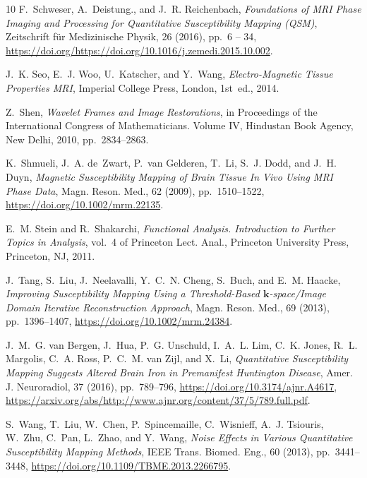 \documentclass[reqno]{siamonline1116}
\numberwithin{theorem}{section}
\numberwithin{equation}{section}
\begin{document}
\begin{thebibliography}{10}
{\sc F.~Schweser, A.~Deistung., and J.~R. Reichenbach}, {\em {Foundations of
  MRI Phase Imaging and Processing for Quantitative Susceptibility Mapping
  (QSM)}}, Zeitschrift f\"{u}r Medizinische Physik, 26 (2016), pp.~6 -- 34,
  \url{https://doi.org/https://doi.org/10.1016/j.zemedi.2015.10.002}.

{\sc J.~K. Seo, E.~J. Woo, U.~Katscher, and Y.~Wang}, {\em {Electro-Magnetic
  Tissue Properties MRI}}, Imperial College Press, London, 1st~ed., 2014.

{\sc Z.~Shen}, {\em {Wavelet Frames and Image Restorations}}, in Proceedings of
  the {I}nternational {C}ongress of {M}athematicians. {V}olume {IV}, Hindustan
  Book Agency, New Delhi, 2010, pp.~2834--2863.

{\sc K.~Shmueli, J.~A. de~Zwart, P.~van Gelderen, T.~Li, S.~J. Dodd, and J.~H.
  Duyn}, {\em {Magnetic Susceptibility Mapping of Brain Tissue In Vivo Using
  MRI Phase Data}}, Magn. Reson. Med., 62 (2009), pp.~1510--1522,
  \url{https://doi.org/10.1002/mrm.22135}.

{\sc E.~M. Stein and R.~Shakarchi}, {\em {Functional Analysis. Introduction to
  Further Topics in Analysis}}, vol.~4 of Princeton Lect. Anal., Princeton
  University Press, Princeton, NJ, 2011.

{\sc J.~Tang, S.~Liu, J.~Neelavalli, Y.~C.~N. Cheng, S.~Buch, and E.~M.
  Haacke}, {\em {Improving Susceptibility Mapping Using a Threshold-Based
  $\boldsymbol{k}$-space/Image Domain Iterative Reconstruction Approach}},
  Magn. Reson. Med., 69 (2013), pp.~1396--1407,
  \url{https://doi.org/10.1002/mrm.24384}.

{\sc J.~M.~G. van Bergen, J.~Hua, P.~G. Unschuld, I.~A.~L. Lim, C.~K. Jones,
  R.~L. Margolis, C.~A. Ross, P.~C.~M. van Zijl, and X.~Li}, {\em {Quantitative
  Susceptibility Mapping Suggests Altered Brain Iron in Premanifest Huntington
  Disease}}, Amer. J. Neuroradiol, 37 (2016), pp.~789--796,
  \url{https://doi.org/10.3174/ajnr.A4617},
  \url{https://arxiv.org/abs/http://www.ajnr.org/content/37/5/789.full.pdf}.

{\sc S.~Wang, T.~Liu, W.~Chen, P.~Spincemaille, C.~Wisnieff, A.~J. Tsiouris,
  W.~Zhu, C.~Pan, L.~Zhao, and Y.~Wang}, {\em {Noise Effects in Various
  Quantitative Susceptibility Mapping Methods}}, IEEE Trans. Biomed. Eng., 60
  (2013), pp.~3441--3448, \url{https://doi.org/10.1109/TBME.2013.2266795}.


\end{thebibliography}
\end{document}
